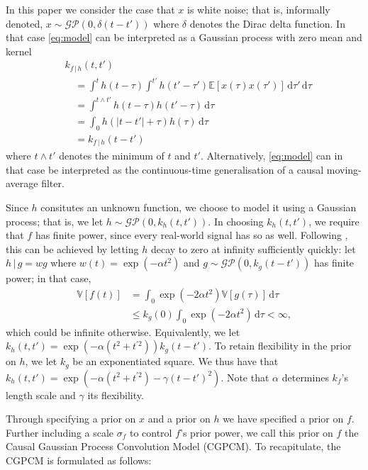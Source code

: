 \documentclass{article}
\newcommand{\id}[1]{\, \mathrm{d} #1}     %
\newcommand{\cond}{\, | \,}               %
\begin{document}
In this paper we consider the case that $x$ is white noise; that is, informally denoted, $x \sim \mathcal{GP}(0,\delta(t-t'))$ where $\delta$ denotes the Dirac delta function. In that case \cref{eq:model} can be interpreted as a Gaussian process with zero mean and kernel
\begin{align}
    &k_{f\cond h}(t,t')\nonumber \\
    &\quad= \int^t h(t- \tau)\int^{t'}h(t'- \tau')
        \mathbb{E}[ x(\tau) x(\tau')]\id{\tau'} \id{\tau} \nonumber \\
    &\quad= \int^{t \land t'} h(t - \tau) h(t' - \tau) \id{\tau} \nonumber \\
    &\quad= \int_0 h(|t - t'| + \tau)h(\tau) \id{\tau} \label{eq:kernel} \\
    &\quad= k_{f\cond h}(t-t') \nonumber
\end{align}
where $t \land t'$ denotes the minimum of $t$ and $t'$. Alternatively, \cref{eq:model} can in that case be interpreted as the continuous-time generalisation of a causal moving-average filter.

Since $h$ consitutes an unknown function, we choose to model it using a Gaussian process; that is, we let $h \sim \mathcal{GP}(0,k_h(t,t'))$. In choosing $k_h(t,t')$, we require that $f$ has finite power, since every real-world signal has so as well. Following \citet{Tobar:2015:Learning_Stationary}, this can be achieved by letting $h$ decay to zero at infinity sufficiently quickly: let $h\cond g = w g$ where $w(t)= \exp(- \alpha t^2)$ and $g \sim \mathcal{GP}(0,k_g(t-t'))$ has finite power; in that case,
\begin{align*}
    \mathbb{V}[f(t)]
    &= \int_{0}\exp(-2 \alpha t^2)\mathbb{V}[g(\tau)]\id{\tau} \\
    &\le k_g(0) \int_0 \exp(- 2 \alpha t^2) \id{\tau} < \infty,
\end{align*}
which could be infinite otherwise.
Equivalently, we let $k_h(t,t')=\exp(- \alpha (t^2 + t^{\prime 2}))k_g(t-t')$. To retain flexibility in the prior on $h$, we let $k_g$ be an exponentiated square. We thus have that $k_h(t,t')=\exp(- \alpha (t^2 + t^{\prime 2}) - \gamma(t-t')^2)$. Note that $\alpha$ determines $k_f$'s length scale and $\gamma$ its flexibility.

Through specifying a prior on $x$ and a prior on $h$ we have specified a prior on $f$. Further including a scale $\sigma_f$ to control $f$'s prior power, we call this prior on $f$ the Causal Gaussian Process Convolution Model (CGPCM). To recapitulate, the CGPCM is formulated as follows:
\end{document}

